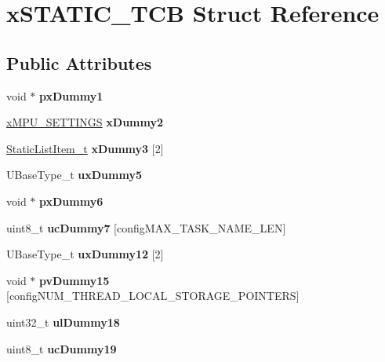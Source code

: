 \hypertarget{structxSTATIC__TCB}{}\section{x\+S\+T\+A\+T\+I\+C\+\_\+\+T\+CB Struct Reference}
\label{structxSTATIC__TCB}
\subsection*{Public Attributes}
\begin{DoxyCompactItemize}
\item 
\mbox{\label{structxSTATIC__TCB_a2f66b620fdeb13f8969f27e1bbb4d1d1}} 
void $\ast$ {\bfseries px\+Dummy1}
\item 
\mbox{\label{structxSTATIC__TCB_a2d8fc45b0ae525b4dc06a88e449de3d6}} 
\mbox{\hyperlink{structMPU__SETTINGS}{x\+M\+P\+U\+\_\+\+S\+E\+T\+T\+I\+N\+GS}} {\bfseries x\+Dummy2}
\item 
\mbox{\label{structxSTATIC__TCB_a7f182aa8f5003494f63d975dabcb3ec1}} 
\mbox{\hyperlink{structxSTATIC__LIST__ITEM}{Static\+List\+Item\+\_\+t}} {\bfseries x\+Dummy3} \mbox{[}2\mbox{]}
\item 
\mbox{\label{structxSTATIC__TCB_ab950bb498901ef7291e49086e5a2efd0}} 
U\+Base\+Type\+\_\+t {\bfseries ux\+Dummy5}
\item 
\mbox{\label{structxSTATIC__TCB_a416495e152e5caef64994f72329c60b0}} 
void $\ast$ {\bfseries px\+Dummy6}
\item 
\mbox{\label{structxSTATIC__TCB_a308771ccd6723cad777695d84a0a2a30}} 
uint8\+\_\+t {\bfseries uc\+Dummy7} \mbox{[}config\+M\+A\+X\+\_\+\+T\+A\+S\+K\+\_\+\+N\+A\+M\+E\+\_\+\+L\+EN\mbox{]}
\item 
\mbox{\label{structxSTATIC__TCB_a4ebf548878e48d8b5232d1b8a1f789ab}} 
U\+Base\+Type\+\_\+t {\bfseries ux\+Dummy12} \mbox{[}2\mbox{]}
\item 
\mbox{\label{structxSTATIC__TCB_a5b590f886ae5d84e4f15646b50e76b45}} 
void $\ast$ {\bfseries pv\+Dummy15} \mbox{[}config\+N\+U\+M\+\_\+\+T\+H\+R\+E\+A\+D\+\_\+\+L\+O\+C\+A\+L\+\_\+\+S\+T\+O\+R\+A\+G\+E\+\_\+\+P\+O\+I\+N\+T\+E\+RS\mbox{]}
\item 
\mbox{\label{structxSTATIC__TCB_ade6781276f913dcd592ee0f6cce76c7e}} 
uint32\+\_\+t {\bfseries ul\+Dummy18}
\item 
\mbox{\label{structxSTATIC__TCB_aa98151056a161f180013ae36dae0d17b}} 
uint8\+\_\+t {\bfseries uc\+Dummy19}
\end{DoxyCompactItemize}


